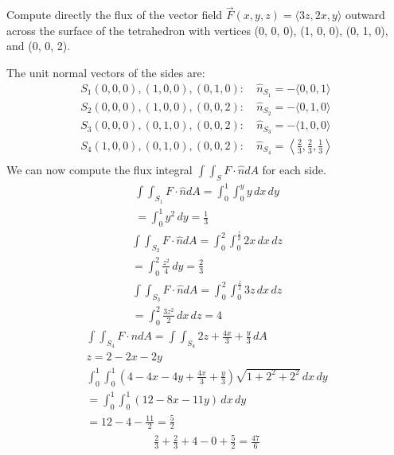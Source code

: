 \documentclass[12pt]{exam}
\begin{document}
\begin{questions}
\question Compute directly the flux of the vector field $\overrightarrow{F}(x, y, z) = \langle 3z, 2x, y \rangle$ outward across the surface of the tetrahedron with vertices (0, 0, 0), (1, 0, 0), (0, 1, 0), and (0, 0, 2).
    \begin{solution}
        The unit normal vectors of the sides are:
        \begin{align*}
            S_1 (0, 0, 0), (1, 0, 0), (0, 1, 0):&\ \hat{n}_{S_1} = -\langle 0, 0, 1 \rangle \\
            S_2 (0, 0, 0), (1, 0, 0), (0, 0, 2):&\ \hat{n}_{S_2} = -\langle 0, 1, 0 \rangle \\
            S_3 (0, 0, 0), (0, 1, 0), (0, 0, 2):&\ \hat{n}_{S_3} = -\langle 1, 0, 0 \rangle \\
            S_4 (1, 0, 0), (0, 1, 0), (0, 0, 2):&\ \hat{n}_{S_4} = \left\langle \frac{2}{3}, \frac{2}{3}, \frac{1}{3} \right\rangle \\
        \end{align*}
        We can now compute the flux integral $\int \int_S F \cdot \hat{n} dA$ for each side.
        \begin{gather*}
            \int \int_{S_1} F \cdot \hat{n} dA = \int_{0}^{1}\int_{0}^{y} y \,dx\,dy \\
            =  \int_{0}^{1} y^2 \,dy = \frac{1}{3}
        \end{gather*}\begin{gather*}
            \int \int_{S_2} F \cdot \hat{n} dA = \int_{0}^{2}\int_{0}^{\frac{z}{2}} 2x \,dx\,dz \\
            =  \int_{0}^{2} \frac{z^2}{4} \,dy = \frac{2}{3}
        \end{gather*}\begin{gather*}
            \int \int_{S_3} F \cdot \hat{n} dA = \int_{0}^{2}\int_{0}^{\frac{z}{2}} 3z \,dx\,dz \\
            = \int_{0}^{2} \frac{3z^2}{2} \,dx\,dz = 4
        \end{gather*}\begin{gather*}
            \int \int_{S_4} F \cdot \hat{n} dA = \int\int_{S_4} 2z + \frac{4x}{3} + \frac{y}{3} \,dA \\
            z = 2 - 2x - 2y\\
            \int_{0}^{1}\int_{0}^{1} \left(4 - 4x - 4y + \frac{4x}{3} + \frac{y}{3}\right)\sqrt{1+2^2+2^2} \,dx\,dy \\
            = \int_{0}^{1}\int_{0}^{1} \left(12 - 8x - 11y\right) \,dx\,dy \\
            = 12 - 4 - \frac{11}{2} = \frac{5}{2}
        \end{gather*}\begin{gather*}
            \frac{2}{3} + \frac{2}{3} + 4 - 0 + \frac{5}{2} = \boxed{\frac{47}{6}}
        \end{gather*}
    \end{solution}
    \clearpage


\end{questions}
\end{document}
